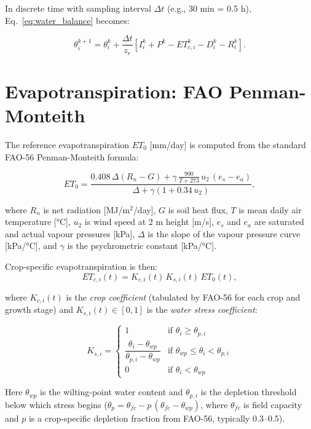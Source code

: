 \documentclass[12pt, a4paper]{report}
\begin{document}
In discrete time with sampling interval $\Delta t$ (e.g., 30 min = 0.5 h), Eq.~\eqref{eq:water_balance} becomes:

\begin{equation}
  \theta_i^{k+1} = \theta_i^k + \frac{\Delta t}{z_r}\left[I_i^k + P^k - ET_{c,i}^k - D_i^k - R_i^k\right].
  \label{eq:discrete_balance}
\end{equation}

\section{Evapotranspiration: FAO Penman-Monteith}

The reference evapotranspiration $ET_0$ [mm/day] is computed from the standard FAO-56 Penman-Monteith formula:

\begin{equation}
  ET_0 = \frac{0.408\,\Delta(R_n - G) + \gamma\,\frac{900}{T+273}\,u_2\,(e_s - e_a)}
               {\Delta + \gamma(1+0.34\,u_2)},
  \label{eq:PM}
\end{equation}

where $R_n$ is net radiation [MJ/m$^2$/day], $G$ is soil heat flux, $T$ is mean daily air temperature [°C], $u_2$ is wind speed at 2 m height [m/s], $e_s$ and $e_a$ are saturated and actual vapour pressures [kPa], $\Delta$ is the slope of the vapour pressure curve [kPa/°C], and $\gamma$ is the psychrometric constant [kPa/°C].

Crop-specific evapotranspiration is then:
\begin{equation}
  ET_{c,i}(t) = K_{c,i}(t)\,K_{s,i}(t)\,ET_0(t),
  \label{eq:ETc}
\end{equation}

where $K_{c,i}(t)$ is the \textit{crop coefficient} (tabulated by FAO-56 for each crop and growth stage) and $K_{s,i}(t) \in [0,1]$ is the \textit{water stress coefficient}:

\begin{equation}
  K_{s,i} = \begin{cases}
    1 & \text{if } \theta_i \geq \theta_{p,i}\\[4pt]
    \dfrac{\theta_i - \theta_{wp}}{\theta_{p,i} - \theta_{wp}} & \text{if } \theta_{wp} \leq \theta_i < \theta_{p,i}\\[8pt]
    0 & \text{if } \theta_i < \theta_{wp}
  \end{cases}
  \label{eq:Ks}
\end{equation}

Here $\theta_{wp}$ is the wilting-point water content and $\theta_{p,i}$ is the depletion threshold below which stress begins ($\theta_{p} = \theta_{fc} - p\,(\theta_{fc}-\theta_{wp})$, where $\theta_{fc}$ is field capacity and $p$ is a crop-specific depletion fraction from FAO-56, typically 0.3–0.5).
\end{document}
